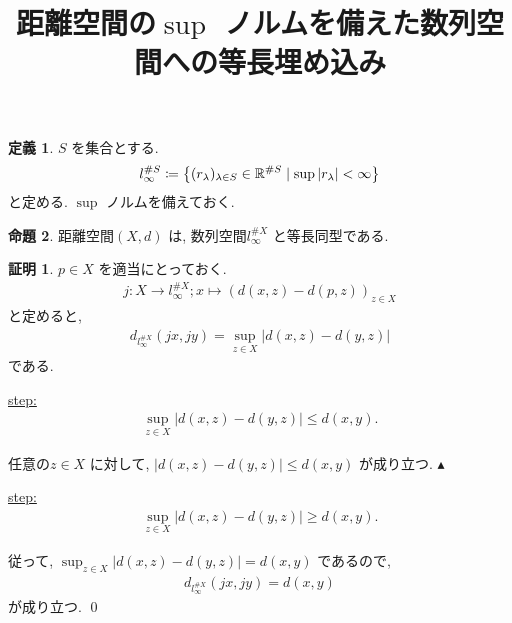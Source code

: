 \documentclass[10pt, fleqn, label-section=none]{bxjsarticle}
\title{距離空間の$\sup$ ノルムを備えた数列空間への等長埋め込み}
\date{}
\author{}
\theoremstyle{definition}
\newtheorem{dfn}{定義}[section]
\newtheorem{prop}[dfn]{命題}
\newtheorem*{pf*}{証明}
\newcommand{\cbra}[1]{\mleft\{#1\mright\}}
\newcommand{\abs}[1]{\left|#1\right|}
\renewcommand{\;}{\, ; \,}
\newenvironment{claim}[1]{\par\noindent\underline{step:}\space#1}{}
\newenvironment{claimproof}[1]{\par\noindent{($\because$)}\space#1}{\hfill $\blacktriangle $}
\begin{document}
\maketitle

\section{}

\begin{dfn}$S$ を集合とする. 
\begin{align*} l_{\infty}^{\# S} \coloneqq \cbra{ (r_\lambda)_{\lambda \in S} \in \mathbb R ^{\# S}  \mid \sup \abs{ r_{\lambda }} < \infty } \end{align*}
と定める. $\sup$ ノルムを備えておく. 
\end{dfn}


\begin{prop}距離空間$(X, d)$ は, 数列空間$l_{\infty}^{\# X}$ と等長同型である. 
\end{prop}
\begin{pf*}$p \in X$ を適当にとっておく. 
\begin{align*} j: X \rightarrow l _{\infty}^{\# X}   ; x \mapsto  (d(x, z) - d(p, z))_{z \in X} \end{align*}
と定めると, 
\begin{align*} d_{l _{\infty}^{\# X}}(jx, jy) = \sup_{z \in X} \abs{d(x, z) - d(y, z)}  \end{align*} 
である. 
\begin{claim}
\begin{align*} \sup_{z \in X} \abs{d(x, z) - d(y, z)}  \leq d(x, y) . \end{align*}
\end{claim}
\begin{claimproof}
任意の$z \in X$ に対して, $\abs{d(x, z) - d(y, z)} \leq d(x, y)$ が成り立つ. 
\end{claimproof}

\begin{claim}
\begin{align*} \sup_{z \in X} \abs{d(x, z) - d(y, z)}  \geq d(x, y) . \end{align*}
\end{claim}

従って, $\sup_{z \in X} \abs{d(x, z) - d(y, z)}  = d(x, y)$ であるので, 
\begin{align*} d_{l _{\infty}^{\# X}}(jx, jy) = d(x, y)\end{align*}
が成り立つ. 
\qed
\end{pf*}
\end{document}
